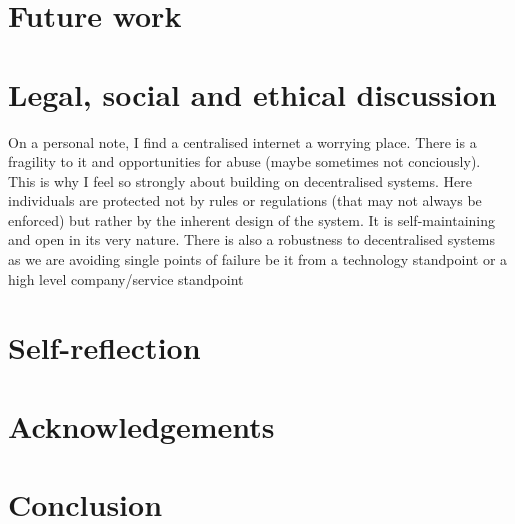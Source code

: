 \documentclass[a4paper]{article}
\begin{document}
\section{Future work}

\section{Legal, social and ethical discussion}
On a personal note, I find a centralised internet a worrying place. There is a fragility to it and opportunities for abuse (maybe sometimes not conciously). This is why I feel so strongly about building on decentralised systems. Here individuals are protected not by rules or regulations (that may not always be enforced) but rather by the inherent design of the system. It is self-maintaining and open in its very nature. There is also a robustness to decentralised systems as we are avoiding single points of failure be it from a technology standpoint or a high level company/service standpoint
\section{Self-reflection}
\section{Acknowledgements}
\section{Conclusion}

\end{document}
